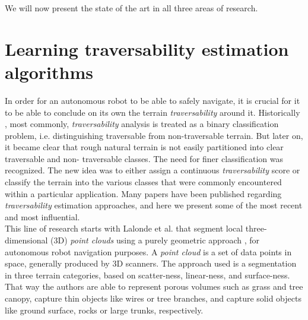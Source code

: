 \documentclass[12pt,a4paper]{report}
\newcommand{\term}{\textit}
\newcommand{\acronym}{\MakeUppercase}
\begin{document}
	We will now present the state of the art in all three areas of research.
	\\
	
	\section{Learning traversability estimation algorithms}
	\label{sec:bg:trav}
	
	In order for an autonomous robot to be able to safely navigate, it is crucial 
	for it to be able to conclude on its own the terrain \term{traversability} 
	around it. Historically \cite{Papadakis}, most commonly, \term{traversability} 
	analysis is treated as a binary classification problem, i.e. distinguishing 
	traversable from non-traversable terrain. But later on, it became clear that 
	rough natural terrain is not easily partitioned into clear traversable and non-
	traversable classes. The need for finer classification was recognized. The new 
	idea was to either assign a continuous \term{traversability} score or classify 
	the terrain into the various classes that were commonly encountered within a 
	particular application. Many papers have been published regarding 
	\term{traversability} estimation approaches, and here we present some of the 
	most recent and most influential.
	\\
	
	This line of research starts with Lalonde et al. that segment local three-
	dimensional (\acronym{3d}) \term{point clouds} using a purely geometric 
	approach \cite{Lalonde}, for autonomous robot navigation purposes. A 
	\term{point cloud} is a set of data points in space, generally produced by 
	\acronym{3d} scanners. The approach used is a segmentation in three terrain 
	categories, based on scatter-ness, linear-ness, and surface-ness. That way 
	the authors are able to represent porous volumes such as grass and tree canopy, 
	capture thin objects like wires or tree branches, and capture solid objects 
	like ground surface, rocks or large trunks, respectively.
	\\	
	
\end{document}

